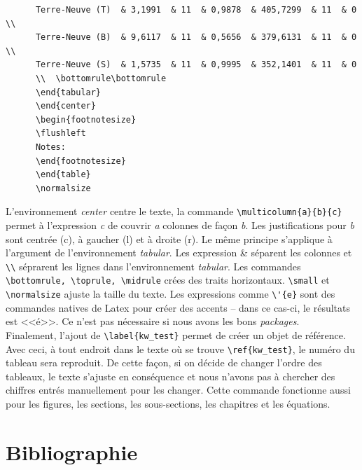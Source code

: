 \documentclass[12pt]{article}
\begin{document}
\begin{lstlisting}
      Terre-Neuve (T)  & 3,1991  & 11  & 0,9878  & 405,7299  & 11  & 0  \\                                                                                                                                                                                                                
      Terre-Neuve (B)  & 9,6117  & 11  & 0,5656  & 379,6131  & 11  & 0  \\                                                                                                                                                                                                                
      Terre-Neuve (S)  & 1,5735  & 11  & 0,9995  & 352,1401  & 11  & 0 
      \\  \bottomrule\bottomrule                                                                                                                                                                               
      \end{tabular}    
      \end{center}     
      \begin{footnotesize}  
      \flushleft     
      Notes: 
      \end{footnotesize}   
      \end{table}  
      \normalsize
   \end{lstlisting}
   
   L'environnement \textit{center} centre le texte, la commande \lstinline|\multicolumn{a}{b}{c}| permet à l'expression \textit{c} de couvrir \textit{a} colonnes de façon \textit{b}. Les justifications pour \textit{b} sont centrée (c), à gaucher (l) et à droite (r). Le même principe s'applique à l'argument de l'environnement \textit{tabular}. Les expression \& séparent les colonnes et \lstinline|\\| séprarent les lignes dans l'environnement \textit{tabular}. Les commandes \lstinline|\bottomrule, \toprule, \midrule| crées des traits horizontaux. \lstinline|\small| et \lstinline|\normalsize| ajuste la taille du texte. Les expressions comme \lstinline|\'{e}| sont des commandes natives de Latex pour créer des accents -- dans ce cas-ci, le résultats est <<é>>. Ce n'est pas nécessaire si nous avons les bons \textit{packages}. \\
   
   Finalement, l'ajout de \lstinline|\label{kw_test}| permet de créer un objet de référence. Avec ceci, à tout endroit dans le texte où se trouve \lstinline|\ref{kw_test}|, le numéro du tableau sera reproduit. De cette façon, si on décide de changer l'ordre des tableaux, le texte s'ajuste en conséquence et nous n'avons pas à chercher des chiffres entrés manuellement pour les changer. Cette commande fonctionne aussi pour les figures, les sections, les sous-sections, les chapitres et les équations.
   
   \section{Bibliographie}
   
\end{document}
